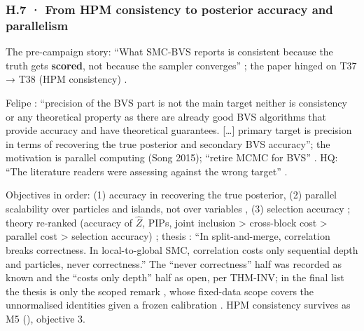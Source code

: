 \subsubsection*{H.7 · From HPM consistency to posterior accuracy and parallelism }
\begin{description}[leftmargin=1.3em,style=unboxed,font=\normalfont]
\item[\textbf{Claim.}] The pre-campaign story: ``What SMC-BVS reports is consistent because the truth gets \textbf{scored}, not because the sampler converges'' ; the paper hinged on T37 → T38 (HPM consistency) .
\item[\textbf{Reversed.}] Felipe : ``precision of the BVS part is not the main target neither is consistency or any theoretical property as there are already good BVS algorithms that provide accuracy and have theoretical guarantees. [\ldots] primary target is precision in terms of recovering the true posterior and secondary BVS accuracy''; the motivation is parallel computing (Song 2015);  ``retire MCMC for BVS'' . HQ: ``The literature readers were assessing against the wrong target'' .
\item[\textbf{Replacement.}] Objectives in order: (1) accuracy in recovering the true posterior, (2) parallel scalability over particles and islands, not over variables , (3) selection accuracy ; theory re-ranked (accuracy of $\hat Z$, PIPs, joint inclusion > cross-block cost > parallel cost > selection accuracy) ; thesis : ``In split-and-merge, correlation breaks correctness. In local-to-global SMC, correlation costs only sequential depth and particles, never correctness.'' The ``never correctness'' half was recorded as known and the ``costs only depth'' half as open, per THM-INV; in the final list the thesis is only the scoped remark , whose fixed-data scope covers the unnormalised identities given a frozen calibration  . HPM consistency survives as M5 (), objective 3.
\end{description}

